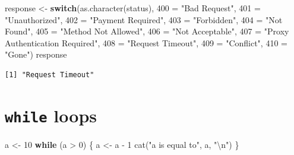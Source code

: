 \documentclass[
]{book}
\newenvironment{Shaded}{\begin{snugshade}}{\end{snugshade}}
\newcommand{\AttributeTok}[1]{\textcolor[rgb]{0.77,0.63,0.00}{#1}}
\newcommand{\ControlFlowTok}[1]{\textcolor[rgb]{0.13,0.29,0.53}{\textbf{#1}}}
\newcommand{\DecValTok}[1]{\textcolor[rgb]{0.00,0.00,0.81}{#1}}
\newcommand{\FunctionTok}[1]{\textcolor[rgb]{0.00,0.00,0.00}{#1}}
\newcommand{\NormalTok}[1]{#1}
\newcommand{\OtherTok}[1]{\textcolor[rgb]{0.56,0.35,0.01}{#1}}
\newcommand{\SpecialCharTok}[1]{\textcolor[rgb]{0.00,0.00,0.00}{#1}}
\newcommand{\StringTok}[1]{\textcolor[rgb]{0.31,0.60,0.02}{#1}}
\begin{document}
\begin{Shaded}
\begin{Highlighting}[]
\NormalTok{response }\OtherTok{\textless{}{-}} \ControlFlowTok{switch}\NormalTok{(}\FunctionTok{as.character}\NormalTok{(status),}
                   \StringTok{\textasciigrave{}}\AttributeTok{400}\StringTok{\textasciigrave{}} \OtherTok{=} \StringTok{"Bad Request"}\NormalTok{,}
                   \StringTok{\textasciigrave{}}\AttributeTok{401}\StringTok{\textasciigrave{}} \OtherTok{=} \StringTok{"Unauthorized"}\NormalTok{,}
                   \StringTok{\textasciigrave{}}\AttributeTok{402}\StringTok{\textasciigrave{}} \OtherTok{=} \StringTok{"Payment Required"}\NormalTok{,}
                   \StringTok{\textasciigrave{}}\AttributeTok{403}\StringTok{\textasciigrave{}} \OtherTok{=} \StringTok{"Forbidden"}\NormalTok{,}
                   \StringTok{\textasciigrave{}}\AttributeTok{404}\StringTok{\textasciigrave{}} \OtherTok{=} \StringTok{"Not Found"}\NormalTok{,}
                   \StringTok{\textasciigrave{}}\AttributeTok{405}\StringTok{\textasciigrave{}} \OtherTok{=} \StringTok{"Method Not Allowed"}\NormalTok{,}
                   \StringTok{\textasciigrave{}}\AttributeTok{406}\StringTok{\textasciigrave{}} \OtherTok{=} \StringTok{"Not Acceptable"}\NormalTok{,}
                   \StringTok{\textasciigrave{}}\AttributeTok{407}\StringTok{\textasciigrave{}} \OtherTok{=} \StringTok{"Proxy Authentication Required"}\NormalTok{,}
                   \StringTok{\textasciigrave{}}\AttributeTok{408}\StringTok{\textasciigrave{}} \OtherTok{=} \StringTok{"Request Timeout"}\NormalTok{,}
                   \StringTok{\textasciigrave{}}\AttributeTok{409}\StringTok{\textasciigrave{}} \OtherTok{=} \StringTok{"Conflict"}\NormalTok{,}
                   \StringTok{\textasciigrave{}}\AttributeTok{410}\StringTok{\textasciigrave{}} \OtherTok{=} \StringTok{"Gone"}\NormalTok{)}
\NormalTok{response}
\end{Highlighting}
\end{Shaded}

\begin{verbatim}
[1] "Request Timeout"
\end{verbatim}

\hypertarget{while-loops}{%
\section{\texorpdfstring{\texttt{while} loops}{while loops}}\label{while-loops}}

\begin{Shaded}
\begin{Highlighting}[]
\NormalTok{a }\OtherTok{\textless{}{-}} \DecValTok{10}
\ControlFlowTok{while}\NormalTok{ (a }\SpecialCharTok{\textgreater{}} \DecValTok{0}\NormalTok{) \{}
\NormalTok{  a }\OtherTok{\textless{}{-}}\NormalTok{ a }\SpecialCharTok{{-}} \DecValTok{1}
  \FunctionTok{cat}\NormalTok{(}\StringTok{"a is equal to"}\NormalTok{, a, }\StringTok{"}\SpecialCharTok{\textbackslash{}n}\StringTok{"}\NormalTok{)}
\NormalTok{\}}
\end{Highlighting}
\end{Shaded}
\end{document}
